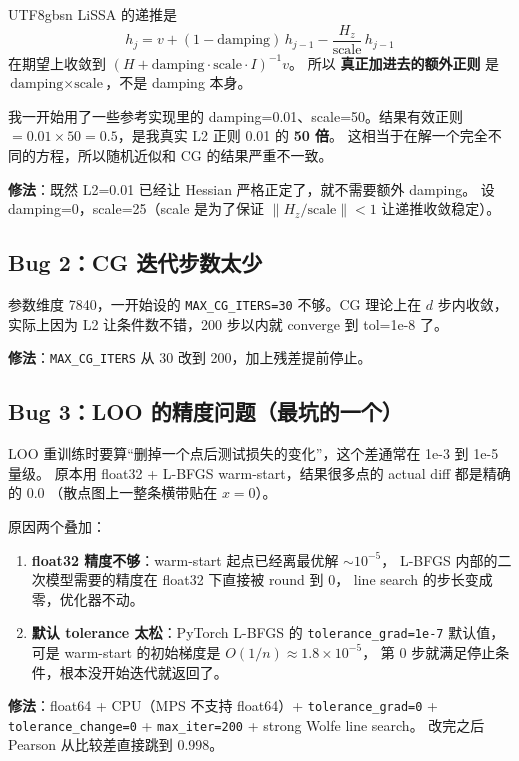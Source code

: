 \documentclass[a4paper,11pt]{article}
\begin{document}
\begin{CJK*}{UTF8}{gbsn}
LiSSA 的递推是
\[
h_j = v + (1 - \text{damping}) \, h_{j-1} - \frac{H_z}{\text{scale}} \, h_{j-1}
\]
在期望上收敛到 $(H + \text{damping} \cdot \text{scale} \cdot I)^{-1} v$。
所以 \textbf{真正加进去的额外正则} 是 $\text{damping} \times \text{scale}$，不是 damping 本身。

我一开始用了一些参考实现里的 damping=0.01、scale=50。结果有效正则
$= 0.01 \times 50 = 0.5$，是我真实 L2 正则 0.01 的 \textbf{50 倍}。
这相当于在解一个完全不同的方程，所以随机近似和 CG 的结果严重不一致。

\textbf{修法}：既然 L2=0.01 已经让 Hessian 严格正定了，就不需要额外 damping。
设 damping=0，scale=25（scale 是为了保证 $\|H_z / \text{scale}\| < 1$ 让递推收敛稳定）。

\subsection*{Bug 2：CG 迭代步数太少}

参数维度 7840，一开始设的 \texttt{MAX\_CG\_ITERS=30} 不够。CG 理论上在 $d$ 步内收敛，
实际上因为 L2 让条件数不错，200 步以内就 converge 到 tol=1e-8 了。

\textbf{修法}：\texttt{MAX\_CG\_ITERS} 从 30 改到 200，加上残差提前停止。

\subsection*{Bug 3：LOO 的精度问题（最坑的一个）}

LOO 重训练时要算``删掉一个点后测试损失的变化''，这个差通常在 1e-3 到 1e-5 量级。
原本用 float32 + L-BFGS warm-start，结果很多点的 actual diff 都是精确的 0.0
（散点图上一整条横带贴在 $x=0$）。

原因两个叠加：
\begin{enumerate}[leftmargin=1.3em, itemsep=2pt]
  \item \textbf{float32 精度不够}：warm-start 起点已经离最优解 $\sim 10^{-5}$，
        L-BFGS 内部的二次模型需要的精度在 float32 下直接被 round 到 0，
        line search 的步长变成零，优化器不动。
  \item \textbf{默认 tolerance 太松}：PyTorch L-BFGS 的 \texttt{tolerance\_grad=1e-7} 默认值，
        可是 warm-start 的初始梯度是 $O(1/n) \approx 1.8 \times 10^{-5}$，
        第 0 步就满足停止条件，根本没开始迭代就返回了。
\end{enumerate}

\textbf{修法}：float64 + CPU（MPS 不支持 float64）+ \texttt{tolerance\_grad=0} +
\texttt{tolerance\_change=0} + \texttt{max\_iter=200} + strong Wolfe line search。
改完之后 Pearson 从比较差直接跳到 0.998。


\end{CJK*}
\end{document}
